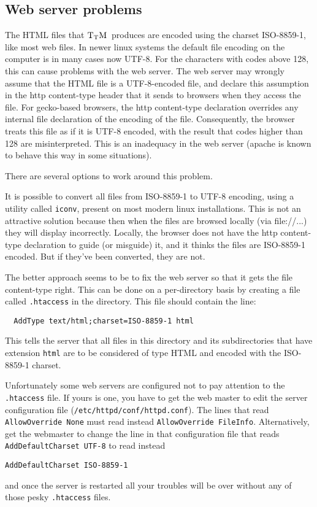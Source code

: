 \documentclass[12pt]{article}
\def\TtM{$\rm{}T_TH$}
\def\TtM{$\rm{}T_TM$}%
\begin{document}
\subsection{Web server problems}

The HTML files that \TtM\ produces are encoded using the charset
ISO-8859-1, like most web files. In newer linux systems the default
file encoding on the computer is in many cases now UTF-8. For the
characters with codes above 128, this can cause problems with the web
server. The web server may wrongly assume that the HTML file is a
UTF-8-encoded file, and declare this assumption in the http content-type
header that it sends to browsers when they access the file. For
gecko-based browsers, the http content-type declaration overrides any
internal file declaration of the encoding of the file. Consequently,
the browser treats this file as if it is UTF-8 encoded, with the
result that codes higher than 128 are misinterpreted. This is an
inadequacy in the web server (apache is known to behave this way in
some situations).

There are several options to work around this problem.

It is possible to convert all files from ISO-8859-1 to UTF-8 encoding,
using a utility called \verb!iconv!, present on most modern linux
installations. This is not an attractive solution because then when
the files are browsed locally (via file://...) they will display
incorrectly. Locally, the browser does not have the http content-type
declaration to guide (or misguide) it, and it thinks the files are
ISO-8859-1 encoded. But if they've been converted, they are not.

The better approach seems to be to fix the web server so that it gets
the file content-type right. This can be done on a per-directory basis
by creating a file called \verb!.htaccess! in the directory. This file
should contain the line:
\begin{verbatim}
  AddType text/html;charset=ISO-8859-1 html
\end{verbatim}
This tells the server that all files in this directory and its
subdirectories that have extension \verb!html! are to be considered of
type HTML and encoded with the ISO-8859-1 charset.

Unfortunately some web servers are configured not to pay attention to
the \verb!.htaccess! file. If yours is one, you have to get the web
master to edit the server configuration file
(\verb!/etc/httpd/conf/httpd.conf!). The lines that read
\verb!AllowOverride None! must read instead
\verb!AllowOverride FileInfo!. Alternatively, get the webmaster to
change the line in that configuration file that reads
\verb!AddDefaultCharset UTF-8! to read instead
\begin{verbatim}
AddDefaultCharset ISO-8859-1
\end{verbatim}
 and once the server is restarted all your troubles will be over
without any of those pesky \verb!.htaccess! files.
 
\end{document}
